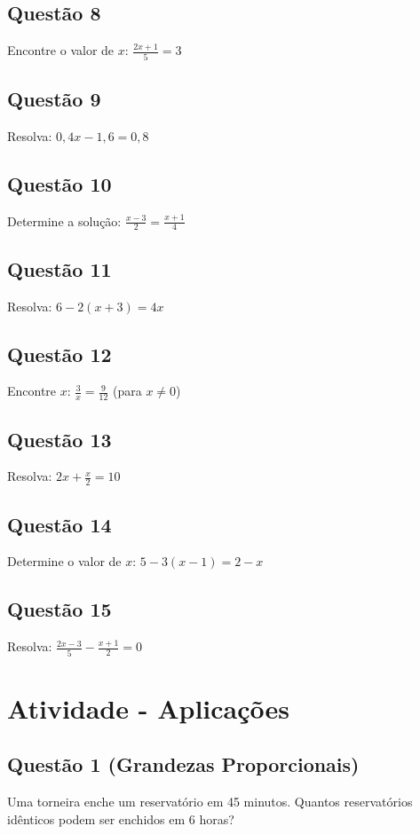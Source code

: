 \documentclass[11pt]{extarticle} %
\begin{document}
\begin{multicols}{2}
\subsection*{Questão 8}
Encontre o valor de \( x \): \( \frac{2x + 1}{5} = 3 \)

\subsection*{Questão 9}
Resolva: \( 0,4x - 1,6 = 0,8 \)

\subsection*{Questão 10}
Determine a solução: \( \frac{x - 3}{2} = \frac{x + 1}{4} \)

\subsection*{Questão 11}
Resolva: \( 6 - 2(x + 3) = 4x \)

\subsection*{Questão 12}
Encontre \( x \): \( \frac{3}{x} = \frac{9}{12} \) (para \( x \neq 0 \))

\subsection*{Questão 13}
Resolva: \( 2x + \frac{x}{2} = 10 \)

\subsection*{Questão 14}
Determine o valor de \( x \): \( 5 - 3(x - 1) = 2 - x \)

\subsection*{Questão 15}
Resolva: \( \frac{2x - 3}{5} - \frac{x + 1}{2} = 0 \)

\columnbreak

\section*{Atividade - Aplicações}

\subsection*{Questão 1 (Grandezas Proporcionais)}
Uma torneira enche um reservatório em 45 minutos. Quantos reservatórios idênticos podem ser enchidos em 6 horas?


\end{multicols}
\end{document}
